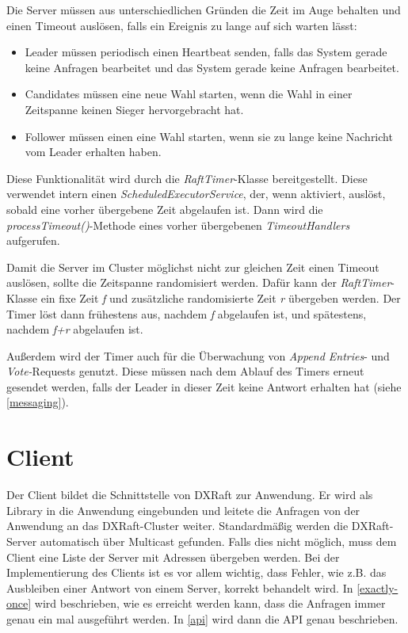 Die Server müssen aus unterschiedlichen Gründen die Zeit im Auge behalten und einen Timeout auslösen, falls ein Ereignis zu lange auf sich warten lässt:

\begin{itemize}
	\item Leader müssen periodisch einen Heartbeat senden, falls das System gerade keine Anfragen bearbeitet und das System gerade keine Anfragen bearbeitet.
	\item Candidates müssen eine neue Wahl starten, wenn die Wahl in einer Zeitspanne keinen Sieger hervorgebracht hat.
	\item Follower müssen einen eine Wahl starten, wenn sie zu lange keine Nachricht vom Leader erhalten haben.
\end{itemize}

Diese Funktionalität wird durch die \textit{RaftTimer}-Klasse bereitgestellt. Diese verwendet intern einen \textit{ScheduledExecutorService}, der, wenn aktiviert, auslöst, sobald eine vorher übergebene Zeit abgelaufen ist. Dann wird die \textit{processTimeout()}-Methode eines vorher übergebenen \textit{TimeoutHandlers} aufgerufen. 

Damit die Server im Cluster möglichst nicht zur gleichen Zeit einen Timeout auslösen, sollte die Zeitspanne randomisiert werden. Dafür kann der \textit{RaftTimer}-Klasse ein fixe Zeit \textit{f} und zusätzliche randomisierte Zeit \textit{r} übergeben werden. Der Timer löst dann frühestens aus, nachdem \textit{f} abgelaufen ist, und spätestens, nachdem \textit{f+r} abgelaufen ist.

Außerdem wird der Timer auch für die Überwachung von \textit{Append Entries}- und \textit{Vote-}Requests genutzt. Diese müssen nach dem Ablauf des Timers erneut gesendet werden, falls der Leader in dieser Zeit keine Antwort erhalten hat (siehe \ref{messaging}).

\section{Client}

Der Client bildet die Schnittstelle von DXRaft zur Anwendung. Er wird als Library in die Anwendung eingebunden und leitete die Anfragen von der Anwendung an das DXRaft-Cluster weiter. Standardmäßig werden die DXRaft-Server automatisch über Multicast gefunden. Falls dies nicht möglich, muss dem Client eine Liste der Server mit Adressen übergeben werden. Bei der Implementierung des Clients ist es vor allem wichtig, dass Fehler, wie z.B. das Ausbleiben einer Antwort von einem Server, korrekt behandelt wird. In \ref{exactly-once} wird beschrieben, wie es erreicht werden kann, dass die Anfragen immer genau ein mal ausgeführt werden. In \ref{api} wird dann die API genau beschrieben.

